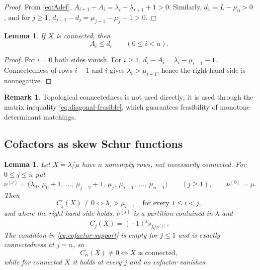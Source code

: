 \documentclass[11pt,a4paper]{amsart}
\numberwithin{equation}{section}
\theoremstyle{plain}
\newtheorem{lemma}[theorem]{Lemma}
\theoremstyle{definition}
\newtheorem{remark}[theorem]{Remark}
\begin{document}
\begin{proof}
From \eqref{eq:Adef}, \(A_{i+1}-A_i =\lambda_i-\lambda_{i+1}+1>0\).
Similarly, \(d_1=L-\mu_0>0\), and for \(j\ge1\), \(d_{j+1}-d_j=\mu_{j-1}-\mu_j+1>0\).
\end{proof}

\begin{lemma}\label{lem:diagonal-feasible}
If \(X\) is connected, then
\begin{equation}\label{eq:diagonal-feasible}
A_i\le d_i
\qquad(0\le i<n).
\end{equation}
\end{lemma}

\begin{proof}
For \(i=0\) both sides vanish.  For \(i\ge1\), \(d_i-A_i=\lambda_i-\mu_{i-1}-1\).
Connectedness of rows \(i-1\) and \(i\) gives \(\lambda_i>\mu_{i-1}\), hence the right-hand side is nonnegative.
\end{proof}

\begin{remark}
Topological connectedness is not used directly; it is used through the matrix inequality \eqref{eq:diagonal-feasible}, which guarantees feasibility of monotone determinant matchings.
\end{remark}

\subsection{Cofactors as skew Schur functions}

\begin{lemma}\label{lem:cofactor-factorization}
Let \(X=\lambda/\mu\) have \(n\) nonempty rows, not necessarily connected.  For \(0\le j\le n\) put
\begin{equation}\label{eq:nu-j}
\nu^{(j)}
=
\bigl(\lambda_0,\ \mu_0+1,\ \ldots,\ \mu_{j-2}+1,\ \mu_j,\ \mu_{j+1},\ \ldots,\ \mu_{n-1}\bigr)
\qquad(j\ge1),
\qquad
\nu^{(0)}=\mu.
\end{equation}
Then
\begin{equation}\label{eq:cofactor-support}
C_j(X)\ne0
\iff
\lambda_i>\mu_{i-1}
\quad\text{for every }1\le i<j,
\end{equation}
and where the right-hand side holds, \(\nu^{(j)}\) is a partition contained in \(\lambda\) and
\begin{equation}\label{eq:cofactor-schur}
C_j(X)=(-1)^j s_{\lambda/\nu^{(j)}}.
\end{equation}
The condition in \eqref{eq:cofactor-support} is empty for \(j\le1\) and is exactly connectedness at \(j=n\), so
\[
C_n(X)\ne0
\iff
X\text{ is connected},
\]
while for connected \(X\) it holds at every \(j\) and no cofactor vanishes.
\end{lemma}
\end{document}
